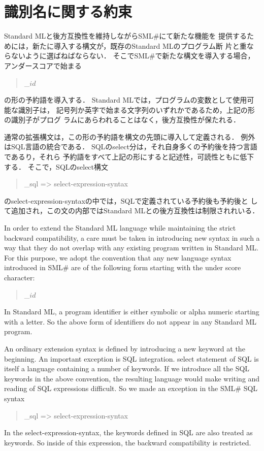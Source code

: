 \documentclass{jbook}
\newif\ifjp
\newcommand{\txt}[2]{#1}
\newcommand{\smlsharp}{SML\#}
\newenvironment{program}{\begin{quote}\begin{tt}}%
                        {\end{tt}\end{quote}}
\begin{document}
\section{\txt{識別名に関する約束}{Conventions on identifiers}}
\ifjp%
	Standard MLと後方互換性を維持しながら\smlsharp{}にて新たな機能を
提供するためには，新たに導入する構文が，既存のStandard MLのプログラム断
片と重ならないように選ばねばならない．
	そこで\smlsharp{}で新たな構文を導入する場合，アンダースコアで始まる
\begin{program}
\_$id$ 
\end{program}
の形の予約語を導入する．
	Standard MLでは，プログラムの変数として使用可能な識別子は，
記号列か英字で始まる文字列のいずれかであるため，上記の形の識別子がプログ
ラムにあらわれることはなく，後方互換性が保たれる．

	通常の拡張構文は，この形の予約語を構文の先頭に導入して定義される．
	例外はSQL言語の統合である．
	SQLのselect分は，それ自身多くの予約後を持つ言語であるり，それら
予約語をすべて上記の形にすると記述性，可読性ともに低下する．
	そこで，SQLのselect構文
\begin{program}
\_sql => {\rm select-expression-syntax}
\end{program}
のselect-expression-syntaxの中では，SQLで定義されている予約後も予約後と
して追加され，この文の内部ではStandard MLとの後方互換性は制限されれいる．

\else%
	In order to extend the Standard ML language while maintaining
the strict backward compatibility, a care must be taken in introducing
new syntax in such a way that they do not overlap with any existing
program written in Standard ML.
	For this purpose, we adopt the convention that any new language
syntax introduced in \smlsharp{} are of the following form starting with
the under score character:
\begin{program}
\_$id$ 
\end{program}
	In Standard ML, a program identifier is either symbolic or alpha
numeric starting with a letter.
	So the above form of identifiers do not appear in any Standard
ML program.

	An ordinary extension syntax is defined by introducing a new
keyword at the beginning.
	An important exception is SQL integration.
	select statement of SQL is itself a language containing a number
of keywords.
	If we introduce all the SQL keywords in the above convention,
the resulting language would make writing and reading of SQL expressions
difficult.
	So we made an exception in the \smlsharp{} SQL syntax
\begin{program}
\_sql => {\rm select-expression-syntax}
\end{program}
	In the select-expression-syntax, the keywords defined in SQL
are also treated as keywords.
	So inside of this expression, the backward compatibility is
restricted.
\end{document}
